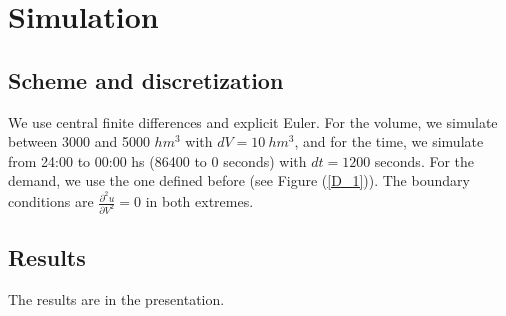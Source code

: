 \documentclass[12pt]{article}
\theoremstyle{definition}
\theoremstyle{remark}
\begin{document}
\section{Simulation}

\subsection{Scheme and discretization}

We use central finite differences and explicit Euler. For the volume, we simulate between 3000 and 5000 $hm^3$ with $dV=10\ hm^3$, and for the time, we simulate from 24:00 to 00:00 hs (86400 to 0 seconds) with $dt=1200$ seconds. For the demand, we use the one defined before (see Figure (\ref{D_1})). The boundary conditions are $\frac{\partial^2 u}{\partial V^2}=0$ in both extremes.

\subsection{Results}

The results are in the presentation.
\end{document}

